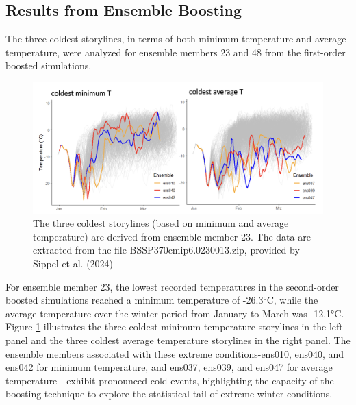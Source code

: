 \documentclass[
]{krantz}
\begin{document}
\subsection{Results from Ensemble Boosting}\label{results-from-ensemble-boosting}

The three coldest storylines, in terms of both minimum temperature and average temperature, were analyzed for ensemble members 23 and 48 from the first-order boosted simulations.

\begin{figure}

{\centering \includegraphics[width=0.9\linewidth]{work/03-coldex/figures/boosting_results23} 

}

\caption{The three coldest storylines (based on minimum and average temperature) are derived from ensemble member 23. The data are extracted from the file BSSP370cmip6.0230013.zip, provided by Sippel et al. (2024)}\label{fig:boosting-result23}
\end{figure}

For ensemble member 23, the lowest recorded temperatures in the second-order boosted simulations reached a minimum temperature of -26.3°C, while the average temperature over the winter period from January to March was -12.1°C. Figure \ref{fig:boosting-result23} illustrates the three coldest minimum temperature storylines in the left panel and the three coldest average temperature storylines in the right panel. The ensemble members associated with these extreme conditions-ens010, ens040, and ens042 for minimum temperature, and ens037, ens039, and ens047 for average temperature---exhibit pronounced cold events, highlighting the capacity of the boosting technique to explore the statistical tail of extreme winter conditions.
\end{document}
